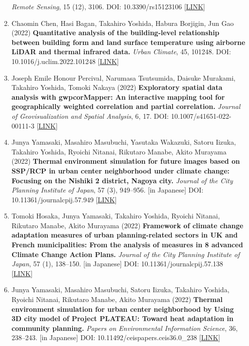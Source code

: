 \documentclass[
]{book}
\begin{document}
\begin{enumerate}
  \emph{Remote Sensing}, 15 (12), 3106.
  DOI: 10.3390/rs15123106 {[}\href{https://www.mdpi.com/2072-4292/15/12/3106}{LINK}{]}
\item
  Chaomin Chen, Hasi Bagan, Takahiro Yoshida, Habura Borjigin, Jun Gao (2022)
  \textbf{Quantitative analysis of the building-level relationship between building form and land surface temperature using airborne LiDAR and thermal infrared data.}
  \emph{Urban Climate}, 45, 101248.
  DOI: 10.1016/j.uclim.2022.101248 {[}\href{https://doi.org/10.1016/j.uclim.2022.101248}{LINK}{]}
\item
  Joseph Emile Honour Percival, Narumasa Tsutsumida, Daisuke Murakami, Takahiro Yoshida, Tomoki Nakaya (2022)
  \textbf{Exploratory spatial data analysis with gwpcorMapper: An interactive mapping tool for geographically weighted correlation and partial correlation.}
  \emph{Journal of Geovisualization and Spatial Analysis}, 6, 17.
  DOI: 10.1007/s41651-022-00111-3 {[}\href{https://link.springer.com/article/10.1007/s41651-022-00111-3}{LINK}{]}
\item
  Junya Yamasaki, Masahiro Masubuchi, Yasutaka Wakazuki, Satoru Iizuka, Takahiro Yoshida, Ryoichi Nitanai, Rikutaro Manabe, Akito Murayama (2022)
  \textbf{Thermal environment simulation for future images based on SSP/RCP in urban center neighborhood under climate change: Focusing on the Nishiki 2 district, Nagoya city.}
  \emph{Journal of the City Planning Institute of Japan}, 57 (3), 949--956. {[}in Japanese{]}
  DOI: 10.11361/journalcpij.57.949 {[}\href{https://doi.org/10.11361/journalcpij.57.949}{LINK}{]}
\item
  Tomoki Hosaka, Junya Yamasaki, Takahiro Yoshida, Ryoichi Nitanai, Rikutaro Manabe, Akito Murayama (2022)
  \textbf{Framework of climate change adaptation measures of urban planning-related sectors in UK and French municipalities: From the analysis of measures in 8 advanced Climate Change Action Plans.}
  \emph{Journal of the City Planning Institute of Japan}, 57 (1), 138--150. {[}in Japanese{]}
  DOI: 10.11361/journalcpij.57.138 {[}\href{https://doi.org/10.11361/journalcpij.57.138}{LINK}{]}
\item
  Junya Yamasaki, Masahiro Masubuchi, Satoru Iizuka, Takahiro Yoshida, Ryoichi Nitanai, Rikutaro Manabe, Akito Murayama (2022)
  \textbf{Thermal environment simulation for urban center neighborhood by Using 3D city model of Project PLATEAU: Toward heat adaptation in community planning.}
  \emph{Papers on Environmental Information Science}, 36, 238--243. {[}in Japanese{]}
  DOI: 10.11492/ceispapers.ceis36.0\_238 {[}\href{https://doi.org/10.11492/ceispapers.ceis36.0_238}{LINK}{]}

\end{enumerate}
\end{document}

